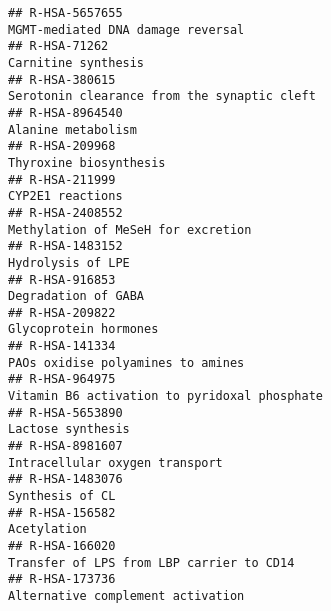\documentclass[
]{article}
\begin{document}
\begin{verbatim}
## R-HSA-5657655                                                                                                    MGMT-mediated DNA damage reversal
## R-HSA-71262                                                                                                                    Carnitine synthesis
## R-HSA-380615                                                                                           Serotonin clearance from the synaptic cleft
## R-HSA-8964540                                                                                                                   Alanine metabolism
## R-HSA-209968                                                                                                                Thyroxine biosynthesis
## R-HSA-211999                                                                                                                      CYP2E1 reactions
## R-HSA-2408552                                                                                                   Methylation of MeSeH for excretion
## R-HSA-1483152                                                                                                                    Hydrolysis of LPE
## R-HSA-916853                                                                                                                   Degradation of GABA
## R-HSA-209822                                                                                                                 Glycoprotein hormones
## R-HSA-141334                                                                                                     PAOs oxidise polyamines to amines
## R-HSA-964975                                                                                          Vitamin B6 activation to pyridoxal phosphate
## R-HSA-5653890                                                                                                                    Lactose synthesis
## R-HSA-8981607                                                                                                       Intracellular oxygen transport
## R-HSA-1483076                                                                                                                      Synthesis of CL
## R-HSA-156582                                                                                                                           Acetylation
## R-HSA-166020                                                                                              Transfer of LPS from LBP carrier to CD14
## R-HSA-173736                                                                                                     Alternative complement activation

\end{verbatim}
\end{document}
